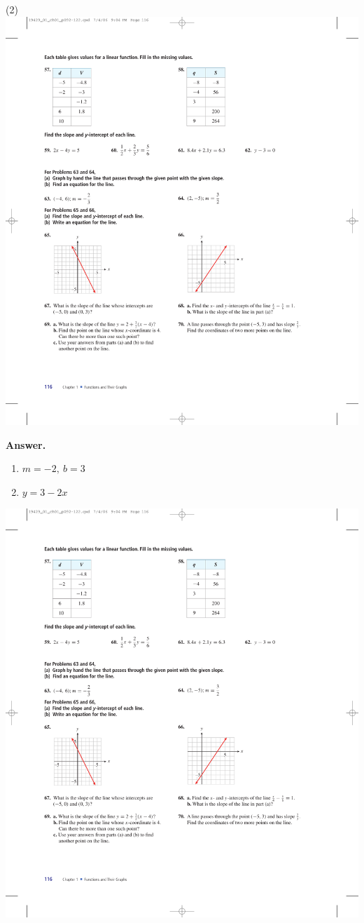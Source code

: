\documentclass[10pt,]{book}
\theoremstyle{plain}
\theoremstyle{definition}
\theoremstyle{definition}
\theoremstyle{definition}
\theoremstyle{definition}
\numberwithin{equation}{part}
\begin{document}
\begin{exerciselist}
\begin{enumerate}[label=*\alph**]
\end{enumerate}
%
\begin{exercisegroup}(2)
\exercise[65.]\hypertarget{exercise-461}{}\includegraphics[width=0.8\linewidth]{images/fig-chap1-rev-65}
%
\par\smallskip
\noindent\textbf{Answer.}\hypertarget{answer-255}{}\quad
\leavevmode%
\begin{multicols}{2}
\begin{enumerate}[label=*\alph**]
\item\hypertarget{li-1637}{}\(m = -2, ~b = 3\)%
\item\hypertarget{li-1638}{}\(y = 3 - 2x\)%
\end{enumerate}
\end{multicols}
%
\exercise[66.]\hypertarget{exercise-462}{}\includegraphics[width=0.8\linewidth]{images/fig-chap1-rev-66}

\end{exercisegroup}
\end{exerciselist}
\end{document}
